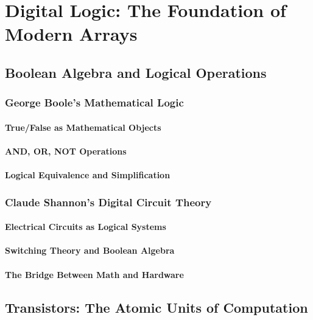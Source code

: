 \documentclass[12pt, oneside, openany]{book}
\begin{document}

\chapter{Digital Logic: The Foundation of Modern Arrays}

\section{Boolean Algebra and Logical Operations}
\subsection{George Boole's Mathematical Logic}
\subsubsection{True/False as Mathematical Objects}
\subsubsection{AND, OR, NOT Operations}
\subsubsection{Logical Equivalence and Simplification}

\subsection{Claude Shannon's Digital Circuit Theory}
\subsubsection{Electrical Circuits as Logical Systems}
\subsubsection{Switching Theory and Boolean Algebra}
\subsubsection{The Bridge Between Math and Hardware}

\section{Transistors: The Atomic Units of Computation}
\end{document}
